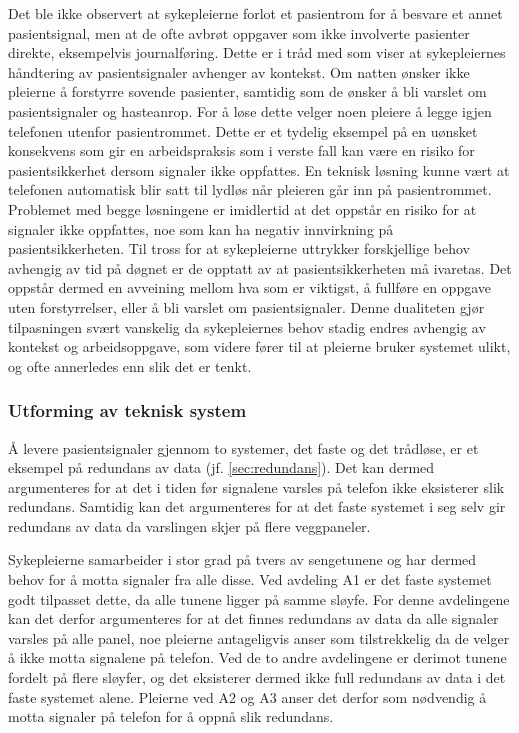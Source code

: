 \noindent
Det ble ikke observert at sykepleierne forlot et pasientrom for å besvare et annet pasientsignal, men at de ofte avbrøt oppgaver som ikke involverte pasienter direkte, eksempelvis journalføring. Dette er i tråd med \citet{klemets13} som viser at sykepleiernes håndtering av pasientsignaler avhenger av kontekst. Om natten ønsker ikke pleierne å forstyrre sovende pasienter, samtidig som de ønsker å bli varslet om pasientsignaler og hasteanrop. For å løse dette velger noen pleiere å legge igjen telefonen utenfor pasientrommet. Dette er et tydelig eksempel på en uønsket konsekvens som gir en arbeidspraksis som i verste fall kan være en risiko for pasientsikkerhet dersom signaler ikke oppfattes. En teknisk løsning kunne vært at telefonen automatisk blir satt til lydløs når pleieren går inn på pasientrommet. Problemet med begge løsningene er imidlertid at det oppstår en risiko for at signaler ikke oppfattes, noe som kan ha negativ innvirkning på pasientsikkerheten. Til tross for at sykepleierne uttrykker forskjellige behov avhengig av tid på døgnet er de opptatt av at pasientsikkerheten må ivaretas. Det oppstår dermed en avveining mellom hva som er viktigst, å fullføre en oppgave uten forstyrrelser, eller å bli varslet om pasientsignaler. Denne dualiteten gjør tilpasningen svært vanskelig da sykepleiernes behov stadig endres avhengig av kontekst og arbeidsoppgave, som videre fører til at pleierne bruker systemet ulikt, og ofte annerledes enn slik det er tenkt. 

\subsubsection{Utforming av teknisk system}
Å levere pasientsignaler gjennom to systemer, det faste og det trådløse, er et eksempel på redundans av data (jf. \ref{sec:redundans}). Det kan dermed argumenteres for at det i tiden før signalene varsles på telefon ikke eksisterer slik redundans. Samtidig kan det argumenteres for at det faste systemet i seg selv gir redundans av data da varslingen skjer på flere veggpaneler. 

\noindent
Sykepleierne samarbeider i stor grad på tvers av sengetunene og har dermed behov for å motta signaler fra alle disse. Ved avdeling A1 er det faste systemet godt tilpasset dette, da alle tunene ligger på samme sløyfe. For denne avdelingene kan det derfor argumenteres for at det finnes redundans av data da alle signaler varsles på alle panel, noe pleierne antageligvis anser som tilstrekkelig da de velger å ikke motta signalene på telefon. Ved de to andre avdelingene er derimot tunene fordelt på flere sløyfer, og det eksisterer dermed ikke full redundans av data i det faste systemet alene. Pleierne ved A2 og A3 anser det derfor som nødvendig å motta signaler på telefon for å oppnå slik redundans. 

